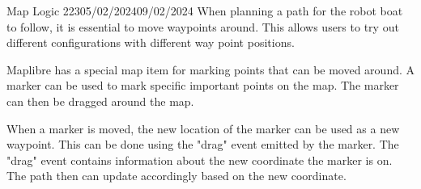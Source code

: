 \documentclass[12pt]{article}
\begin{document}
\begin{logbook-entry}{Map Logic 2}{23}{05/02/2024}{09/02/2024}
When planning a path for the robot boat to follow, it is essential to move waypoints around.
This allows users to try out different configurations with different way point positions.

Maplibre has a special map item for marking points that can be moved around.
A marker can be used to mark specific important points on the map.
The marker can then be dragged around the map.

When a marker is moved, the new location of the marker can be used as a new waypoint.
This can be done using the "drag" event emitted by the marker.
The "drag" event contains information about the new coordinate the marker is on.
The path then can update accordingly based on the new coordinate.
\end{logbook-entry}
\end{document}
